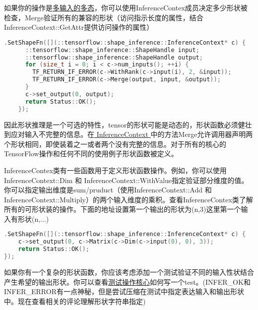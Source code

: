 如果你的操作是\href{https://www.tensorflow.org/extend/adding_an_op?hl=zh-cn#polymorphism}{多输入的多态}，你可以使用InferenceContex成员决定多少形状被检查，Merge验证所有的兼容的形状（访问指示长度的属性，结合InferenceContext::GetAttr提供访问操作的属性）
\begin{lstlisting}[language=C++]
 .SetShapeFn([](::tensorflow::shape_inference::InferenceContext* c) {
      ::tensorflow::shape_inference::ShapeHandle input;
      ::tensorflow::shape_inference::ShapeHandle output;
      for (size_t i = 0; i < c->num_inputs(); ++i) {
        TF_RETURN_IF_ERROR(c->WithRank(c->input(i), 2, &input));
        TF_RETURN_IF_ERROR(c->Merge(output, input, &output));
      }
      c->set_output(0, output);
      return Status::OK();
    });

\end{lstlisting}
因此形状推理是一个可选的特性，tensor的形状可能是动态的，形状函数必须健壮到应对输入不完整的信息。在\href{https://www.github.com/tensorflow/tensorflow/blob/r1.4/tensorflow/core/framework/shape_inference.h}{ InferenceContext }中的方法Merge允许调用器声明两个形状相同，即使装着之一或者两个没有完整的信息。对于所有的核心的TensorFlow操作和任何不同的使用例子形状函数被定义。

InferenceContex类有一些函数用于定义形状函数操作。例如，你可以使用InferenceContext::Dim 和 InferenceContext::WithValue指定验证部分维度的值。你可以指定输出维度是sum/pruduct（使用InferenceContext::Add 和 InferenceContext::Multiply）的两个输入维度的乘积。查看InferenceContex类了解所有的可形状装的操作。下面的地址设置第一个输出的形状为(n,3)这里第一个输入有形状(n,...)
\begin{lstlisting}[language=C++]
.SetShapeFn([](::tensorflow::shape_inference::InferenceContext* c) {
    c->set_output(0, c->Matrix(c->Dim(c->input(0), 0), 3));
    return Status::OK();
});

\end{lstlisting}
如果你有一个复杂的形状函数，你应该考虑添加一个测试验证不同的输入性状结合产生希望的输出形状。你可以查看\href{https://www.github.com/tensorflow/tensorflow/blob/r1.4/tensorflow/core/ops/array_ops_test.cc}{测试操作核心}如何写一个test。(INFER\_OK和INFER\_ERROR有一点神秘，但是尝试压缩在测试中指定表达输入和输出形状中。现在查看相关的评论理解形状字符串指定)
